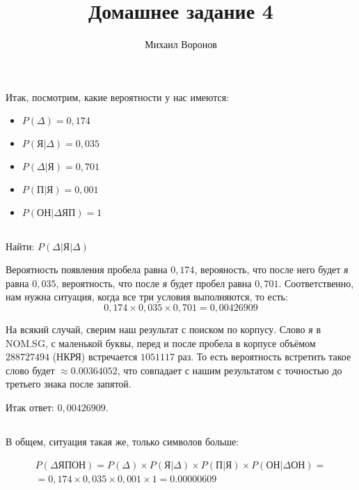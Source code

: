 \documentclass[a4paper,10pt]{article}
\title{Домашнее задание 4}
\author{Михаил Воронов}
\begin{document}
\maketitle

\section{}

Итак, посмотрим, какие вероятности у нас имеются:
\begin{itemize}
 \item $P(\Delta) = 0,174$
 \item $P(\text{Я}|\Delta) = 0,035$
 \item $P(\Delta|\text{Я}) = 0,701$
 \item $P(\text{П}|\text{Я}) = 0,001$
 \item $P(\text{ОН}|\Delta\text{ЯП}) = 1$
\end{itemize}

\subsection{}
Найти: $P(\Delta|\text{Я}|\Delta)$

Вероятность появления пробела равна $0,174$, верояность, что после него будет \textit{я} равна $0,035$, вероятность, что после \textit{я} будет пробел равна $0,701$. Соответственно, нам нужна ситуация, когда все три условия выполняются, то есть:
$$ 0,174 \times 0,035 \times 0,701 = 0,00426909 $$

На всякий случай, сверим наш результат с поиском по корпусу. Слово \textit{я} в \textsc{NOM.SG}, с маленькой буквы, перед и после пробела в корпусе объёмом $288 727 494$ (НКРЯ) встречается $1 051 117$ раз. То есть вероятность встретить такое слово будет $\approx 0.00364052$, что совпадает с нашим результатом с точностью до третьего знака после запятой.

Итак ответ: $0,00426909$.

\subsection{}
В общем, ситуация такая же, только символов больше:

\begin{multline*}
P(\Delta\text{ЯПОН})
= P(\Delta) \times P(\text{Я}|\Delta) \times P(\text{П}|\text{Я})
\times P(\text{ОН}|\Delta\text{ОН}) = \\
= 0,174 \times 0,035 \times 0,001 \times 1
= 0.00000609
\end{multline*}
\end{document}
